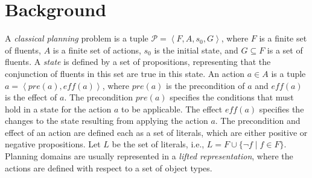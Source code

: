 \documentclass[letterpaper]{article} %
\newcommand{\tuple}[1]{\ensuremath{\left \langle #1 \right \rangle }}
\newif\ifaddcomments
\newcommand{\roni}[1]{\ifaddcomments{\textcolor{red}{[Roni: #1]}}\fi}
\newcommand{\pascalJr}[1]{\ifaddcomments{\textcolor{cyan}{[Pascal L.: {#1}]}}\fi}
\begin{document}
\section{Background}

A \emph{classical planning} problem is a tuple $\mathcal{P} = \tuple{F, A, s_0, G}$, where $F$ is a finite set of fluents, $A$ is a finite set of actions, $s_0$ is the initial state, and $G\subseteq F$ is a set of fluents. 
A \emph{state} is defined by a set of propositions, representing that the conjunction of fluents in this set are true in this state.
An action $a\in A$ is a tuple $a = \tuple{\mathit{pre}(a), \mathit{eff}(a)}$, where $\mathit{pre}(a)$ is the precondition of $a$ and $\mathit{eff}(a)$ is the effect of $a$. 
The precondition $\mathit{pre}(a)$ specifies the conditions that must hold in a state for the action $a$ to be applicable. The effect $\mathit{eff}(a)$ specifies the changes to the state resulting from applying the action $a$.   
The precondition and effect of an action are defined each as a set of literals, which are either positive or negative propositions. Let $L$ be the set of literals, i.e., 
$L = F \cup \{\neg f \mid f\in F\}$.
Planning domains are usually represented in a \emph{lifted representation}, where the actions are defined with respect to a set of object types.
\end{document}
